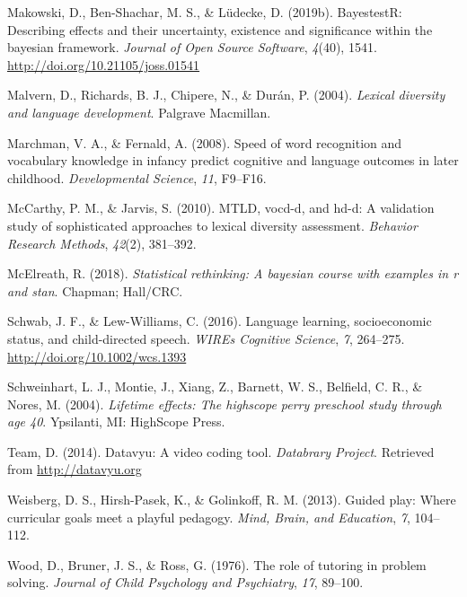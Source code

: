 \documentclass[man,floatsintext]{apa6}
\begin{document}
\leavevmode\hypertarget{ref-bayestestR}{}%
Makowski, D., Ben-Shachar, M. S., \& Lüdecke, D. (2019b). BayestestR: Describing effects and their uncertainty, existence and significance within the bayesian framework. \emph{Journal of Open Source Software}, \emph{4}(40), 1541. \url{http://doi.org/10.21105/joss.01541}

\leavevmode\hypertarget{ref-Malvern2004}{}%
Malvern, D., Richards, B. J., Chipere, N., \& Durán, P. (2004). \emph{Lexical diversity and language development}. Palgrave Macmillan.

\leavevmode\hypertarget{ref-Marchman2008}{}%
Marchman, V. A., \& Fernald, A. (2008). Speed of word recognition and vocabulary knowledge in infancy predict cognitive and language outcomes in later childhood. \emph{Developmental Science}, \emph{11}, F9--F16.

\leavevmode\hypertarget{ref-McCarthy2010}{}%
McCarthy, P. M., \& Jarvis, S. (2010). MTLD, vocd-d, and hd-d: A validation study of sophisticated approaches to lexical diversity assessment. \emph{Behavior Research Methods}, \emph{42}(2), 381--392.

\leavevmode\hypertarget{ref-McElreath2018}{}%
McElreath, R. (2018). \emph{Statistical rethinking: A bayesian course with examples in r and stan}. Chapman; Hall/CRC.

\leavevmode\hypertarget{ref-Schwab2016}{}%
Schwab, J. F., \& Lew-Williams, C. (2016). Language learning, socioeconomic status, and child-directed speech. \emph{WIREs Cognitive Science}, \emph{7}, 264--275. \url{http://doi.org/10.1002/wcs.1393}

\leavevmode\hypertarget{ref-PerryPreschool2004}{}%
Schweinhart, L. J., Montie, J., Xiang, Z., Barnett, W. S., Belfield, C. R., \& Nores, M. (2004). \emph{Lifetime effects: The highscope perry preschool study through age 40}. Ypsilanti, MI: HighScope Press.

\leavevmode\hypertarget{ref-datavyu}{}%
Team, D. (2014). Datavyu: A video coding tool. \emph{Databrary Project}. Retrieved from \url{http://datavyu.org}

\leavevmode\hypertarget{ref-Weisberg2013}{}%
Weisberg, D. S., Hirsh-Pasek, K., \& Golinkoff, R. M. (2013). Guided play: Where curricular goals meet a playful pedagogy. \emph{Mind, Brain, and Education}, \emph{7}, 104--112.

\leavevmode\hypertarget{ref-Wood1976}{}%
Wood, D., Bruner, J. S., \& Ross, G. (1976). The role of tutoring in problem solving. \emph{Journal of Child Psychology and Psychiatry}, \emph{17}, 89--100.
\end{document}
